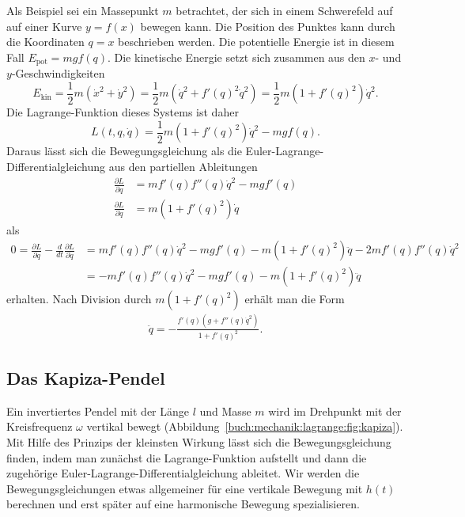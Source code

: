 Als Beispiel sei ein Massepunkt $m$ betrachtet, der sich in einem
Schwerefeld auf auf einer Kurve $y=f(x)$ bewegen kann.
Die Position des Punktes kann durch die Koordinaten $q=x$ beschrieben
werden.
Die potentielle Energie ist in diesem Fall $E_{\text{pot}} = mgf(q)$.
Die kinetische Energie setzt sich zusammen aus den $x$- und
$y$-Geschwindigkeiten
\[
E_{\text{kin}}
=
\frac12m(\dot{x}^2 + \dot{y}^2)
=
\frac12m(\dot{q}^2 + f'(q)^2 \dot{q}^2)
=
\frac12m(1+f'(q)^2)\dot{q}^2.
\]
Die Lagrange-Funktion dieses Systems ist daher 
\[
L(t,q,\dot{q})
=
\frac12m(1+f'(q)^2)\dot{q}^2 - mgf(q).
\]
Daraus lässt sich die Bewegungsgleichung als die
Euler-Lagrange-Differentialgleichung aus den partiellen Ableitungen
\begin{align*}
\frac{\partial L}{\partial q}
&=
mf'(q)f''(q)\dot{q}^2 - mgf'(q)
\\
\frac{\partial L}{\partial\dot{q}}
&=
m(1+f'(q)^2)\dot{q}
\end{align*}
als
\begin{align*}
0
=
\frac{\partial L}{\partial q}-\frac{d}{dt}\frac{\partial L}{\partial\dot{q}}
&=
mf'(q)f''(q)\dot{q}^2
-
mgf'(q)
-
m(1+f'(q)^2)\ddot{q}
-
2mf'(q)f''(q)\dot{q}^2
\\
&=
-
mf'(q)f''(q)\dot{q}^2
-
mgf'(q)
-
m(1+f'(q)^2)\ddot{q}
\end{align*}
erhalten.
Nach Division durch $m(1+f'(q)^2)$ erhält man die Form
\begin{align*}
\ddot{q}
=
-
\frac{f'(q)(g+f''(q)\dot{q}^2)}{1+f'(q)^2}.
\end{align*}


%
%
\subsection{Das Kapiza-Pendel
\label{buch:mechanik:lagrange:subsection:kapiza}}

%
Ein invertiertes Pendel mit der Länge $l$ und Masse $m$ wird im
Drehpunkt mit der Kreisfrequenz $\omega$ vertikal bewegt
(Abbildung~\ref{buch:mechanik:lagrange:fig:kapiza}).
Mit Hilfe des Prinzips der kleinsten Wirkung lässt sich die
Bewegungsgleichung finden, indem man zunächst die Lagrange-Funktion
aufstellt und dann die zugehörige Euler-Lagrange-Differentialgleichung
ableitet.
Wir werden die Bewegungsgleichungen etwas allgemeiner für eine
vertikale Bewegung mit $h(t)$ berechnen und erst später auf eine
harmonische Bewegung spezialisieren.

